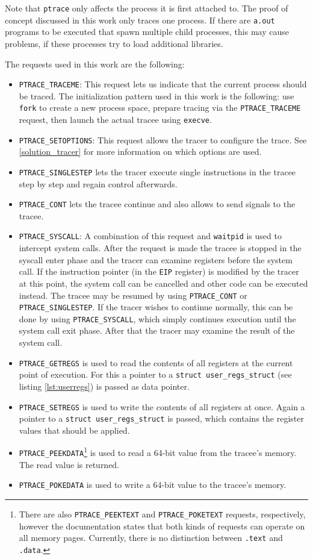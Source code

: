 \documentclass[draft,final]{vutinfth} %
\begin{document}
Note that \texttt{ptrace} only affects the process it is first attached to. The proof of concept discussed in this work only traces one process. If there are \texttt{a.out} programs to be executed that spawn multiple child processes, this may cause problems, if these processes try to load additional libraries.

The requests used in this work are the following:

\begin{itemize}
    \item \texttt{PTRACE\_TRACEME}: This request lets us indicate that the current process should be traced. The initialization pattern used in this work is the following: use \texttt{fork} to create a new process space, prepare tracing via the \texttt{PTRACE\_TRACEME} request, then launch the actual tracee using \texttt{execve}.
    \item \texttt{PTRACE\_SETOPTIONS}: This request allows the tracer to configure the trace. See \ref{solution_tracer} for more information on which options are used.
    \item \texttt{PTRACE\_SINGLESTEP} lets the tracer execute single instructions in the tracee step by step and regain control afterwards.
    \item \texttt{PTRACE\_CONT} lets the tracee continue and also allows to send signals to the tracee.
    \item \texttt{PTRACE\_SYSCALL}: A combination of this request and \texttt{waitpid} is used to intercept system calls. After the request is made the tracee is stopped in the syscall enter phase and the tracer can examine registers before the system call. If the instruction pointer (in the \texttt{EIP} register) is modified by the tracer at this point, the system call can be cancelled and other code can be executed instead. The tracee may be resumed by using \texttt{PTRACE\_CONT} or \texttt{PTRACE\_SINGLESTEP}. If the tracer wishes to continue normally, this can be done by using \texttt{PTRACE\_SYSCALL}, which simply continues execution until the system call exit phase. After that the tracer may examine the result of the system call.
    \item \texttt{PTRACE\_GETREGS} is used to read the contents of all registers at the current point of execution. For this a pointer to a \texttt{struct user\_regs\_struct} (see listing \ref{lst:userregs}) is passed as data pointer.
    \item \texttt{PTRACE\_SETREGS} is used to write the contents of all registers at once. Again a pointer to a \texttt{struct user\_regs\_struct} is passed, which contains the register values that should be applied.
    \item \texttt{PTRACE\_PEEKDATA}\footnote{There are also \texttt{PTRACE\_PEEKTEXT} and \texttt{PTRACE\_POKETEXT} requests, respectively, however the documentation states that both kinds of requests can operate on all memory pages. Currently, there is no distinction between \texttt{.text} and \texttt{.data}.} is used to read a 64-bit value from the tracee's memory. The read value is returned.
    \item \texttt{PTRACE\_POKEDATA} is used to write a 64-bit value to the tracee's memory.
\end{itemize}
\end{document}

